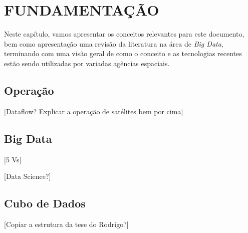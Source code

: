 
\chapter{FUNDAMENTAÇÃO}
\label{ch:fun}

Neste capítulo, vamos apresentar os conceitos relevantes para este documento, bem como apresentação uma revisão da literatura na área de \textit{Big Data}, terminando com uma visão geral de como o conceito e as tecnologias recentes estão sendo utilizadas por variadas agências espaciais.

\section{Operação}
\label{ch:fun:operations}

[Dataflow? Explicar a operação de satélites bem por cima]

{\color{red}
\section{Big Data}
\label{ch:fun:bigdata}

[5 Vs]

[Data Science?]

\section{Cubo de Dados}
\label{ch:fun:cube}

[Copiar a estrutura da tese do Rodrigo?]
}
